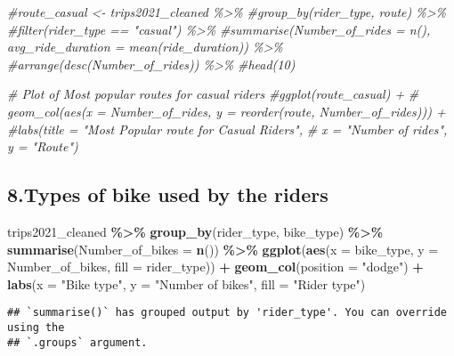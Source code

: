 \documentclass[
]{article}
\newenvironment{Shaded}{\begin{snugshade}}{\end{snugshade}}
\newcommand{\AttributeTok}[1]{\textcolor[rgb]{0.13,0.29,0.53}{#1}}
\newcommand{\CommentTok}[1]{\textcolor[rgb]{0.56,0.35,0.01}{\textit{#1}}}
\newcommand{\FunctionTok}[1]{\textcolor[rgb]{0.13,0.29,0.53}{\textbf{#1}}}
\newcommand{\NormalTok}[1]{#1}
\newcommand{\SpecialCharTok}[1]{\textcolor[rgb]{0.81,0.36,0.00}{\textbf{#1}}}
\newcommand{\StringTok}[1]{\textcolor[rgb]{0.31,0.60,0.02}{#1}}
\begin{document}
\begin{Shaded}
\begin{Highlighting}[]
\CommentTok{\#route\_casual \textless{}{-} trips2021\_cleaned \%\textgreater{}\% }
  \CommentTok{\#group\_by(rider\_type, route) \%\textgreater{}\% }
  \CommentTok{\#filter(rider\_type == "casual") \%\textgreater{}\% }
  \CommentTok{\#summarise(Number\_of\_rides = n(), avg\_ride\_duration = mean(ride\_duration)) \%\textgreater{}\% }
  \CommentTok{\#arrange(desc(Number\_of\_rides)) \%\textgreater{}\% }
  \CommentTok{\#head(10)}

 \CommentTok{\# Plot of Most popular routes for casual riders}
\CommentTok{\#ggplot(route\_casual) + }
 \CommentTok{\# geom\_col(aes(x = Number\_of\_rides, y = reorder(route, Number\_of\_rides))) +}
  \CommentTok{\#labs(title = "Most Popular route for Casual Riders",}
     \CommentTok{\#  x = "Number of rides", y = "Route")}
\end{Highlighting}
\end{Shaded}

\hypertarget{types-of-bike-used-by-the-riders}{%
\subsection{8.Types of bike used by the
riders}\label{types-of-bike-used-by-the-riders}}

\begin{Shaded}
\begin{Highlighting}[]
\NormalTok{trips2021\_cleaned }\SpecialCharTok{\%\textgreater{}\%} 
  \FunctionTok{group\_by}\NormalTok{(rider\_type, bike\_type) }\SpecialCharTok{\%\textgreater{}\%} 
  \FunctionTok{summarise}\NormalTok{(}\AttributeTok{Number\_of\_bikes =} \FunctionTok{n}\NormalTok{()) }\SpecialCharTok{\%\textgreater{}\%} 
  \FunctionTok{ggplot}\NormalTok{(}\FunctionTok{aes}\NormalTok{(}\AttributeTok{x =}\NormalTok{ bike\_type, }\AttributeTok{y =}\NormalTok{ Number\_of\_bikes, }\AttributeTok{fill =}\NormalTok{ rider\_type)) }\SpecialCharTok{+} 
  \FunctionTok{geom\_col}\NormalTok{(}\AttributeTok{position =} \StringTok{"dodge"}\NormalTok{) }\SpecialCharTok{+}
  \FunctionTok{labs}\NormalTok{(}\AttributeTok{x =} \StringTok{"Bike type"}\NormalTok{, }\AttributeTok{y =} \StringTok{"Number of bikes"}\NormalTok{, }\AttributeTok{fill =} \StringTok{"Rider type"}\NormalTok{)}
\end{Highlighting}
\end{Shaded}

\begin{verbatim}
## `summarise()` has grouped output by 'rider_type'. You can override using the
## `.groups` argument.
\end{verbatim}
\end{document}
